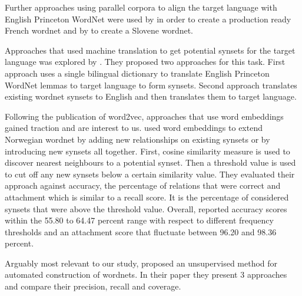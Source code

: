 Further approaches using parallel corpora to align the target language with English Princeton WordNet were used by \textcite{sagotBuilding2008} in order to create a production ready French wordnet and by \textcite{fiserLeveraging2009} to create a Slovene wordnet.

Approaches that used machine translation to get potential synsets for the target language was explored by \textcite{lam_automatically_2014}.
They proposed two approaches for this task.
First approach uses a single bilingual dictionary to translate English Princeton WordNet lemmas to target language to form synsets.
Second approach translates existing wordnet synsets to English and then translates them to target language.

Following the publication of word2vec, approaches that use word embeddings gained traction and are interest to us.
\textcite{sandWordnet2017} used word embeddings to extend Norwegian wordnet by adding new relationships on existing synsets or by introducing new synsets all together.
First, cosine similarity measure is used to discover nearest neighbours to a potential synset.
Then a threshold value is used to cut off any new synsets below a certain similarity value.
They evaluated their approach against accuracy, the percentage of relations that were correct and attachment which is similar to a recall score.
It is the percentage of considered synsets that were above the threshold value.
Overall, \citeauthor{sandWordnet2017} reported accuracy scores within the 55.80 to 64.47 percent range with respect to different frequency thresholds and an attachment score that fluctuate between 96.20 and 98.36 percent.

Arguably most relevant to our study, \textcite{khodakAutomated2017} proposed an unsupervised method for automated construction of wordnets.
In their paper  they present 3 approaches and compare their precision, recall and coverage.

